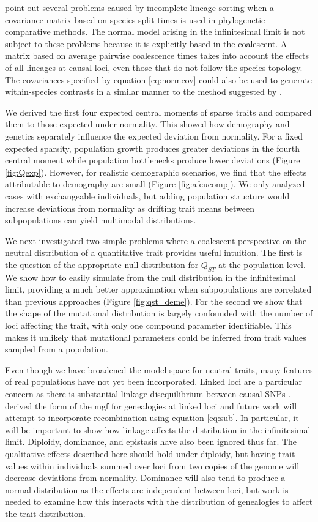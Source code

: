 \citet{Mendes2018} point out several problems caused by incomplete
lineage sorting when a covariance matrix based on species split times is used in
phylogenetic comparative methods. The normal model arising in the infinitesimal
limit is not subject to these problems because it is explicitly based in the
coalescent. A matrix based on average pairwise coalescence times takes into
account the effects of all lineages at causal loci, even those that do not
follow the species topology. The covariances specified by
equation \eqref{eq:normcov} could also be used to generate within-species
contrasts in a similar manner to the method suggested
by \citet{Felsenstein2002}.

We derived the first four expected central moments of sparse traits and compared
them to those expected under normality. This showed how demography and genetics
separately influence the expected deviation from normality. For a fixed expected
sparsity, population growth produces greater deviations in the fourth central
moment while population bottlenecks produce lower deviations (Figure
\ref{fig:Qexp}). However, for realistic demographic scenarios,
we find that the effects attributable to demography are small (Figure
\ref{fig:afeucomp}). We only analyzed cases with exchangeable individuals,
but adding population structure would increase deviations from normality as
drifting trait means between subpopulations can yield multimodal distributions.

We next investigated two simple problems where a coalescent perspective on the
neutral distribution of a quantitative trait provides useful intuition. The
first is the question of the appropriate null distribution for $Q_{ST}$ at the
population level. We show how to easily simulate from the null distribution in
the infinitesimal limit, providing a much better approximation when
subpopulations are correlated than previous approaches \citep{Whitlock2009}
(Figure \ref{fig:qst_deme}). For the second we show that the shape of the
mutational distribution is largely confounded with the number of loci affecting
the trait, with only one compound parameter identifiable. This makes it unlikely
that mutational parameters could be inferred from trait values sampled from a
population.

Even though we have broadened the model space for neutral traits, many features
of real populations have not yet been incorporated. Linked loci are a particular
concern as there is substantial linkage disequilibrium between causal
SNPs \citep{Bulik-Sullivan2015}. \citet{Lohse2011} derived the form of the mgf
for genealogies at linked loci and future work will attempt to incorporate
recombination using equation \eqref{eq:sub}. In particular, it will be important
to show how linkage affects the distribution in the infinitesimal limit.
Diploidy, dominance, and epistasis have also been ignored thus far. The
qualitative effects described here should hold under diploidy, but having trait
values within individuals summed over loci from two copies of the genome will
decrease deviations from normality. Dominance will also tend to produce a normal
distribution as the effects are independent between loci, but work is needed to
examine how this interacts with the distribution of genealogies to affect the
trait distribution.

